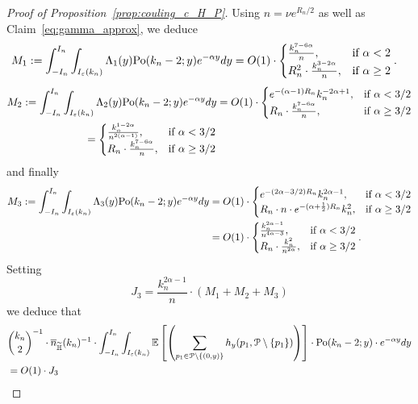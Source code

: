 \begin{proof}[Proof of Proposition~\ref{prop:couling_c_H_P}]
Using $n=\nu e^{R_n/2}$ as well as Claim~\ref{eq:gamma_approx}, 
we deduce
\begin{align*} 
M_1:= \int_{-I_n}^{I_n} \int_{I_\eps (k_n)} \Lambda_1 (y)  \Pop{y}{k_n-2} e^{-\alpha y} dy
&= O(1) \cdot 
\begin{cases} 
\frac{k_n^{7-6\alpha}}{n}, & \mbox{if $\alpha <2$} \\
R_n^2 \cdot \frac{k_n^{3-2\alpha}}{n}, & \mbox{if $\alpha \geq 2$}
\end{cases}. 
\end{align*}
\begin{align*} 
M_2:= \int_{-I_n}^{I_n} \int_{I_\eps (k_n)} \Lambda_2 (y)  \Pop{y}{k_n-2} e^{-\alpha y} dy
&= O(1) \cdot 
\begin{cases}
e^{-(\alpha - 1)R_n} k_n^{-2\alpha+1}, & \mbox{if $\alpha < 3/2$} \\
R_n  \cdot \frac{k_n^{7-6\alpha }}{n}, & \mbox{if $\alpha \geq 3/2$}
\end{cases} 
\\
=\begin{cases}
\frac{k_n^{1-2\alpha}}{n^{2(\alpha-1)}}, & \mbox{if $\alpha < 3/2$} \\
R_n  \cdot \frac{k_n^{7-6\alpha }}{n}, & \mbox{if $\alpha \geq 3/2$}
\end{cases}
\end{align*}
and finally 
\begin{align*} 
M_3:=\int_{-I_n}^{I_n} \int_{I_\eps (k_n)} \Lambda_3 (y)  \Pop{y}{k_n-2} e^{-\alpha y} dy
&= O(1) \cdot 
\begin{cases} 
e^{-(2\alpha - 3/2) R_n} k_n^{2\alpha - 1}, & \mbox{if $\alpha <3/2$} \\ 
R_n \cdot n \cdot e^{-(\alpha +\frac12)R_n} k_n^2, &\mbox{if $\alpha \geq 3/2$}
\end{cases} \\
&=O(1) \cdot 
\begin{cases} 
\frac{k_n^{2\alpha - 1}}{n^{4\alpha -3}}, & \mbox{if $\alpha <3/2$} \\ 
R_n \cdot \frac{k_n^2}{n^{2\alpha}}, &\mbox{if $\alpha \geq 3/2$}
\end{cases}  .
\end{align*}
Setting 
$$ J_3 = \frac{k_n^{2\alpha-1}}{n}\cdot  \left(M_1+ M_2 + M_3 \right) $$
we deduce that 
\begin{align*}
&{k_n\choose 2}^{-1}\cdot \expH^{-1} \cdot \int_{-I_n}^{I_n} \int_{I_\eps (k_n)} \Exp{\left( \sum_{p_1 \in \Pcal \setminus \{(0,y)\}} h_y (p_1, \Pcal \setminus \{ p_1 \})\right)} \cdot  \Pop{y}{k_n-2} \cdot e^{-\alpha y} dy \\
&= O(1) \cdot J_3
\end{align*}



\end{proof}
